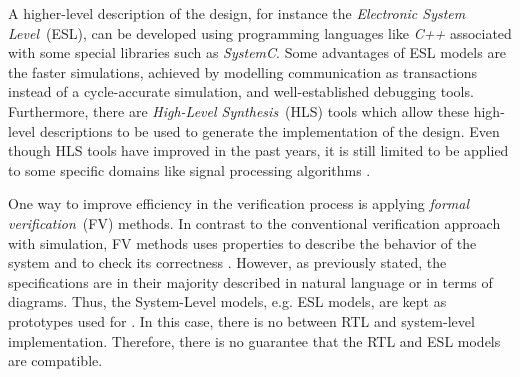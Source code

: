 A higher-level description of the design, for instance the \textit{Electronic System Level}~(ESL), can be developed using programming languages like \textit{C++} associated with some special libraries such as \textit{SystemC}. Some advantages of ESL models are the   faster simulations, achieved by modelling communication as transactions instead of a cycle-accurate simulation, and well-established debugging tools. Furthermore, there are \textit{High-Level Synthesis}~(HLS) tools which allow these high-level descriptions to be used to generate the implementation of the design. Even though HLS tools have improved in the past years, it is still limited to be applied to some specific domains like signal processing algorithms \cite{paper-pdd}. 

One way to improve efficiency in the verification process is applying \textit{formal verification}~(FV) methods. In contrast to the conventional verification approach with simulation, FV methods uses properties to describe the behavior of the system and to check its correctness   . However, as previously stated, the specifications are in their majority described in natural language or in terms of diagrams. Thus, the System-Level models, e.g. ESL models,  are kept as  prototypes used for  . In this case, there is no  between RTL and system-level implementation. Therefore, there is no guarantee that the RTL and ESL models are compatible.

